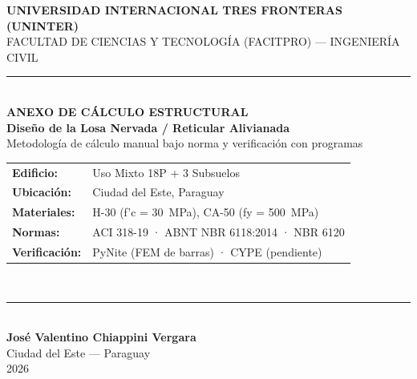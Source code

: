 \begin{titlepage}
\begin{center}

{\LARGE\textbf{UNIVERSIDAD INTERNACIONAL TRES FRONTERAS (UNINTER)}}\\[6pt]
{\large FACULTAD DE CIENCIAS Y TECNOLOGÍA (FACITPRO) --- INGENIERÍA CIVIL}\\[10pt]
\rule{\textwidth}{0.8pt}\\[14pt]

{\LARGE\textbf{ANEXO DE CÁLCULO ESTRUCTURAL}}\\[10pt]
{\large\textbf{Diseño de la Losa Nervada / Reticular Alivianada}}\\[6pt]
{\large Metodología de cálculo manual bajo norma y verificación con programas}\\[24pt]

\begin{minipage}{0.85\textwidth}
\centering
\begin{tabular}{ll}
\textbf{Edificio:} & Uso Mixto 18P + 3 Subsuelos \\
\textbf{Ubicación:} & Ciudad del Este, Paraguay \\
\textbf{Materiales:} & H-30 (f'c = \SI{30}{\mega\pascal}), CA-50 (fy = \SI{500}{\mega\pascal}) \\
\textbf{Normas:} & ACI 318-19 · ABNT NBR 6118:2014 · NBR 6120 \\
\textbf{Verificación:} & PyNite (FEM de barras) · CYPE (pendiente) \\
\end{tabular}
\end{minipage}\\[30pt]

\rule{\textwidth}{0.8pt}\\[12pt]
{\large\textbf{José Valentino Chiappini Vergara}}\\[6pt]
{\large Ciudad del Este --- Paraguay}\\[6pt]
{\large 2026}

\end{center}
\end{titlepage}